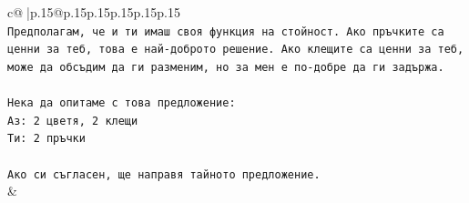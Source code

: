 \documentclass{article}
\begin{document}
{\begin{supertabular}{c@{$\;$}|p{.15\linewidth}@{}p{.15\linewidth}p{.15\linewidth}p{.15\linewidth}p{.15\linewidth}p{.15\linewidth}}
{{{\\ 
\texttt{Предполагам, че и ти имаш своя функция на стойност. Ако пръчките са ценни за теб, това е най{-}доброто решение. Ако клещите са ценни за теб, може да обсъдим да ги разменим, но за мен е по{-}добре да ги задържа.} \\
\\ 
\texttt{Нека да опитаме с това предложение:} \\
\texttt{Аз: 2 цветя, 2 клещи} \\
\texttt{Ти: 2 пръчки} \\
\\ 
\texttt{Ако си съгласен, ще направя тайното предложение.} \\
            }
        }
    }
    & \\ \\


\end{supertabular}}
\end{document}
